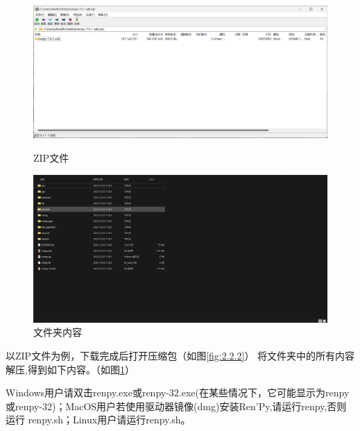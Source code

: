\begin{figure}[htbp]
    \begin{minipage}{200pt}
        \centering
        \includegraphics[scale=.2]{Pictures/1/1.2/1.2.2.png}
        \caption{ZIP文件}
        \label{fig:2.2.2}
    \end{minipage}
    \begin{minipage}{180pt}
        \centering
        \includegraphics[scale=.15]{Pictures/1/1.2/1.2.3.png}
        \caption{文件夹内容}
        \label{fig:2.2.3}
    \end{minipage}
\end{figure}
以ZIP文件为例，下载完成后打开压缩包（如图\ref{fig:2.2.2}）
将文件夹中的所有内容解压,得到如下内容。（如图\ref{fig:2.2.3}）

Windows用户请双击renpy.exe或renpy-32.exe(在某些情况下，它可能显示为renpy或renpy-32)；MacOS用户若使用驱动器镜像(dmg)安装Ren'Py,请运行renpy,否则运行 renpy.sh；Linux用户请运行renpy.sh。

